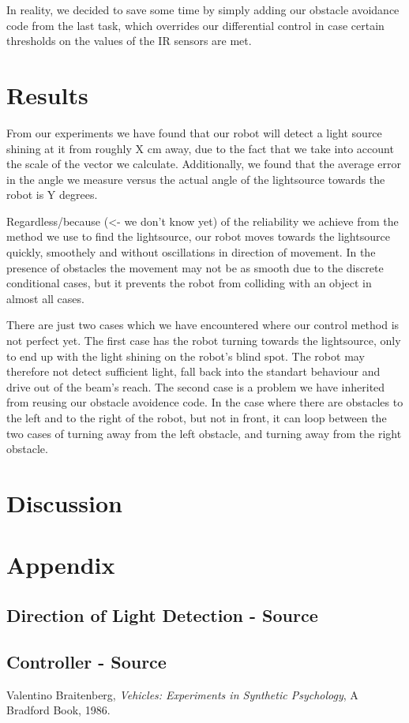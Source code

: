\documentclass[paper=a4, fontsize=12pt]{scrartcl}	%
\numberwithin{equation}{section}		%
\numberwithin{figure}{section}			%
\numberwithin{table}{section}				%
\begin{document}
In reality, we decided to save some time by simply adding our obstacle avoidance code from the last task, which overrides our differential control in case certain thresholds on the values of the IR sensors are met.
\section{Results}
From our experiments we have found that our robot will detect a light source shining at it from roughly X cm away, due to the fact that we take into account the scale of the vector we calculate. Additionally, we found that the average error in the angle we measure versus the actual angle of the lightsource towards the robot is Y degrees.

Regardless/because (<- we don't know yet) of the reliability we achieve from the method we use to find the lightsource, our robot moves towards the lightsource quickly, smoothely and without oscillations in direction of movement. In the presence of obstacles the movement may not be as smooth due to the discrete conditional cases, but it prevents the robot from colliding with an object in almost all cases.

There are just two cases which we have encountered where our control method is not perfect yet. The first case has the robot turning towards the lightsource, only to end up with the light shining on the robot's blind spot. The robot may therefore not detect sufficient light, fall back into the standart behaviour and drive out of the beam's reach. The second case is a problem we have inherited from reusing our obstacle avoidence code. In the case where there are obstacles to the left and to the right of the robot, but not in front, it can loop between the two cases of turning away from the left obstacle, and turning away from the right obstacle.
\section{Discussion}


\section{Appendix}
\subsection{Direction of Light Detection - Source}

\subsection{Controller - Source}

\begin{thebibliography}{9}
  Valentino Braitenberg,
  \emph{Vehicles: Experiments in Synthetic Psychology},
  A Bradford Book,
  1986.
\end{thebibliography}

\end{document}
